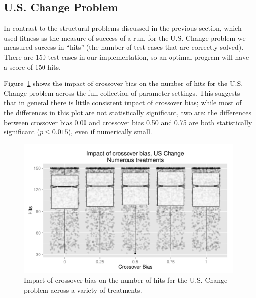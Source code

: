 \documentclass{sig-alternate}
\begin{document}
%
%
%
%

\subsection{U.S. Change Problem} \label{sec:USChange}

In contrast to the structural problems discussed in the previous section, which used fitness as the measure of success
of a run, for the U.S. Change problem we measured success in ``hits'' (the number of test cases that are correctly
solved). There are 150 test cases in our implementation, so an optimal program will have a score of 150 hits.

Figure~\ref{fig:USChange_Hits} shows the impact of crossover bias on the number of hits for the U.S. Change problem
across the full collection of parameter settings. This suggests that in general there is little consistent impact of
crossover bias; while most of the differences in this plot are not statistically significant, two are: the differences
between crossover bias 0.00 and crossover bias 0.50 and 0.75 are both statistically significant ($p \leq 0.015$), even
if numerically small.

\begin{figure}
\centering
\includegraphics[width=0.45 \textwidth]{Plots/US_change_hits.pdf}
\caption{Impact of crossover bias on the number of hits for the U.S. Change problem across a variety of treatments.}
\label{fig:USChange_Hits}
\end{figure}

%
%
%
%
\end{document}
